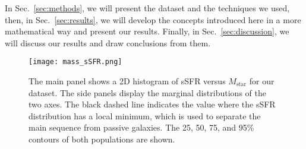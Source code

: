 \documentclass[fleqn,usenatbib]{mnras}
\begin{document}
In Sec.~\ref{sec:methods}, we will present the dataset and the techniques we used, then, in Sec.~\ref{sec:results}, we will develop the concepts introduced here in a more mathematical way and present our results. Finally, in Sec.~\ref{sec:discussion}, we will discuss our results and draw conclusions from them.

\begin{figure}\centering
	\texttt{[image: mass\_sSFR.png]}
    \caption{The main panel shows a 2D histogram of sSFR versus $M_{\text{star}}$ for our dataset. The side panels display the marginal distributions of the two axes. The black dashed line indicates the value where the sSFR distribution has a local minimum, which is used to separate the main sequence from passive galaxies. The 25, 50, 75, and 95\% contours of both populations are shown.}
    \label{fig:mass_sSFR}
\end{figure}
\end{document}
